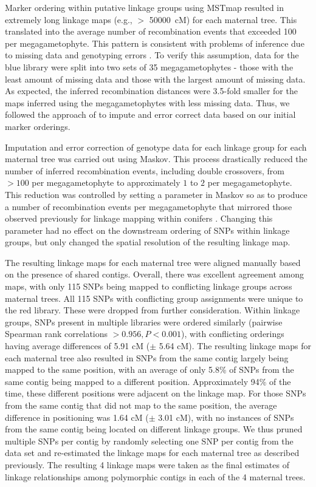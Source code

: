\documentclass[11pt]{article}
\begin{document}
Marker ordering within putative linkage groups using MSTmap resulted in extremely long linkage maps (e.g., $>$ \SI{50000} {cM}) for each maternal tree. 
This translated into the average number of recombination events that exceeded \num{100} per megagametophyte. This pattern
is consistent with problems of inference due to missing data and genotyping errors \citep{Ward:2013}. To verify this assumption, data for the
blue library were split into two sets of \num{35} megagametophytes - those with the least amount of missing data and those with the 
largest amount of missing data. As expected, the inferred recombination distances were 3.5-fold smaller for the maps inferred
using the megagametophytes with less missing data. Thus, we followed the approach of \citet{Ward:2013} to impute and error correct
data based on our initial marker orderings.

Imputation and error correction of genotype data for each linkage group for each maternal tree was carried out using Maskov. This
process drastically reduced the number of inferred recombination events, including double crossovers, from $> 100$ per 
megagametophyte to approximately $1$ to $2$ per megagametophyte. This reduction was controlled by setting a parameter
in Maskov so as to produce a number of recombination events per megagametophyte that mirrored those observed previously for
linkage mapping within conifers \citep{Eckert:2009, Martinez-Garcia:2013}. Changing this parameter had no effect on the downstream
ordering of SNPs within linkage groups, but only changed the spatial resolution of the resulting linkage map.

The resulting linkage maps for each maternal tree were aligned manually based on the presence of shared contigs. Overall, there
was excellent agreement among maps, with only 115 SNPs being mapped to conflicting linkage groups across maternal trees. All 115
SNPs with conflicting group assignments were unique to the red library. These were dropped from further consideration. 
Within linkage groups, SNPs present in multiple libraries were ordered similarly (pairwise Spearman rank correlations $> 0.956, 
P < 0.001$), with conflicting orderings having average differences of 5.91 cM ($\pm$ 5.64 cM). The resulting linkage maps for each maternal tree also
resulted in SNPs from the same contig largely being mapped to the same position, with an average of only 5.8\% of SNPs 
from the same contig being mapped to a different position. 
Approximately 94\% of the time, these different positions were adjacent on the linkage map. For those SNPs from the same contig that
did not map to the same position, the average difference in positioning was 1.64 cM ($\pm$ 3.01 cM), with no instances 
of SNPs from the same contig being located on different linkage groups. We thus pruned multiple SNPs per contig by randomly
selecting one SNP per contig from the data set and re-estimated the linkage maps for each maternal tree as described previously. 
The resulting \num{4} linkage maps were taken as the final estimates of linkage relationships among polymorphic contigs 
in each of the \num{4} maternal trees.
\end{document}
